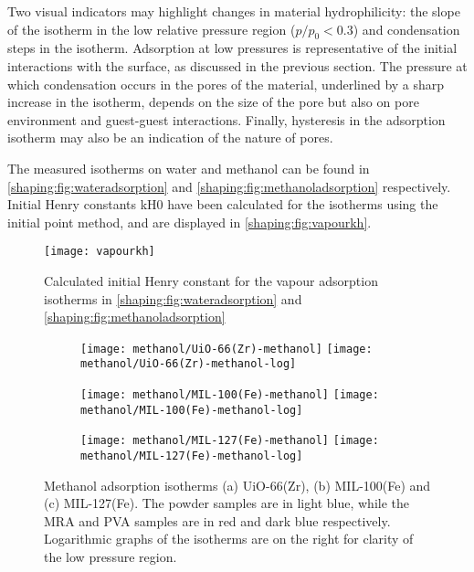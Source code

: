 Two visual indicators may highlight changes in material hydrophilicity: 
the slope of the isotherm in the low relative pressure region 
(\(p/p_0 < 0.3\)) and condensation steps in the isotherm. 
Adsorption at low pressures is representative of the initial
interactions with the surface, as discussed in the previous section.
The pressure at which condensation occurs in the pores of the material, 
underlined by a sharp increase in the isotherm, depends on the 
size of the pore but also on pore environment and 
guest-guest interactions. Finally, hysteresis in the adsorption 
isotherm may also be an indication of the nature of pores.

The measured isotherms on water and methanol can be found
in \autoref{shaping:fig:wateradsorption} 
and \autoref{shaping:fig:methanoladsorption} respectively.
Initial Henry constants \gls{kH0} have been calculated for the isotherms
using the initial point method, and are displayed in
\autoref{shaping:fig:vapourkh}.

\begin{figure}[htb]
    \centering
    \texttt{[image: vapourkh]}%
    \caption{Calculated initial Henry constant for
    the vapour adsorption isotherms 
    in \autoref{shaping:fig:wateradsorption}
    and \autoref{shaping:fig:methanoladsorption}}%
    \label{shaping:fig:vapourkh}
\end{figure}

\begin{figure}[p!]
    \centering

    \begin{subfigure}{\linewidth}
        \centering
        \texttt{[image: methanol/UiO-66(Zr)-methanol]}%
        \texttt{[image: methanol/UiO-66(Zr)-methanol-log]}%
        \caption{}\label{shaping:fig:methanoluio66}%
    \end{subfigure}%

    \begin{subfigure}{\linewidth}
        \centering
        \texttt{[image: methanol/MIL-100(Fe)-methanol]}%
        \texttt{[image: methanol/MIL-100(Fe)-methanol-log]}%
        \caption{}\label{shaping:fig:methanolmil100}%
    \end{subfigure}%

    \begin{subfigure}{\linewidth}
        \centering
        \texttt{[image: methanol/MIL-127(Fe)-methanol]}%
        \texttt{[image: methanol/MIL-127(Fe)-methanol-log]}%
        \caption{}\label{shaping:fig:methanolmil127}%
    \end{subfigure}%
    
    \caption{Methanol adsorption isotherms (a) UiO-66(Zr), 
    (b) MIL-100(Fe) and (c) MIL-127(Fe). The powder samples are in light
    blue, while the \gls{MRA} and \gls{PVA} samples are in red
    and dark blue respectively. Logarithmic 
    graphs of the isotherms are on the right for clarity of the low
    pressure region.}%
    \label{shaping:fig:methanoladsorption}
\end{figure}

